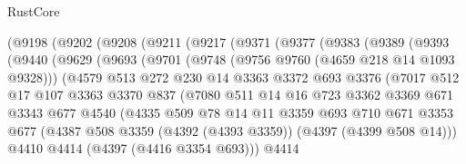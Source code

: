 \begin{lexlean}{RustCore}
\begin{coremodule}
      (@9198
        (@9202
          (@9208
            (@9211
              (@9217
                (@9371
                  (@9377
                    (@9383
                      (@9389
                        (@9393
                          (@9440
                            (@9629
                              (@9693
                                (@9701
                                  (@9748 (@9756 @9760 (@4659 @218 @14 @1093 @9328)))
                                  (@4579
                                    @513
                                    @272
                                    @230
                                    @14
                                    @3363
                                    @3372
                                    @693
                                    @3376
                                    (@7017
                                      @512
                                      @17
                                      @107
                                      @3363
                                      @3370
                                      @837
                                      (@7080
                                        @511
                                        @14
                                        @16
                                        @723
                                        @3362
                                        @3369
                                        @671
                                        @3343
                                        @677
                                        @4540
                                        (@4335
                                          @509
                                          @78
                                          @14
                                          @11
                                          @3359
                                          @693
                                          @710
                                          @671
                                          @3353
                                          @677
                                          (@4387
                                            @508
                                            @3359
                                            (@4392 (@4393 @3359))
                                            (@4397 (@4399 @508 @14)))
                                          @4410
                                          @4414
                                          (@4397 (@4416 @3354 @693)))
                                        @4414

\end{coremodule}
\end{lexlean}
